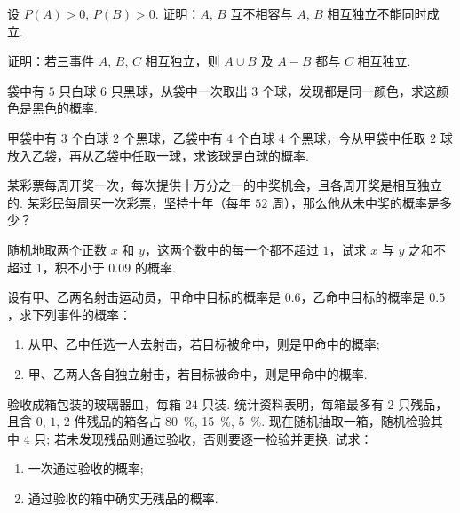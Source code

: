 	\begin{titwo}
		设 $P(A) > 0$, $P(B) > 0$. 证明：$A$, $B$ 互不相容与 $A$, $B$ 相互独立不能同时成立.
	\end{titwo}

	\begin{titwo}
		证明：若三事件 $A$, $B$, $C$ 相互独立，则 $A \cup B$ 及 $A - B$ 都与 $C$ 相互独立.
	\end{titwo}

	\begin{titwo}
		袋中有 $5$ 只白球 $6$ 只黑球，从袋中一次取出 $3$ 个球，发现都是同一颜色，求这颜色是黑色的概率.
	\end{titwo}

	\begin{titwo}
		甲袋中有 $3$ 个白球 $2$ 个黑球，乙袋中有 $4$ 个白球 $4$ 个黑球，今从甲袋中任取 $2$ 球放入乙袋，再从乙袋中任取一球，求该球是白球的概率.
	\end{titwo}

	\begin{titwo}
		某彩票每周开奖一次，每次提供十万分之一的中奖机会，且各周开奖是相互独立的. 某彩民每周买一次彩票，坚持十年（每年 $52$ 周），那么他从未中奖的概率是多少？
	\end{titwo}

	\begin{titwo}
		随机地取两个正数 $x$ 和 $y$，这两个数中的每一个都不超过 $1$，试求 $x$ 与 $y$ 之和不超过 $1$，积不小于 $0.09$ 的概率.
	\end{titwo}

	\begin{titwo}
		设有甲、乙两名射击运动员，甲命中目标的概率是 $0.6$，乙命中目标的概率是 $0.5$，求下列事件的概率：
		\begin{enumerate}
			\item 从甲、乙中任选一人去射击，若目标被命中，则是甲命中的概率;
			\item 甲、乙两人各自独立射击，若目标被命中，则是甲命中的概率.
		\end{enumerate}
	\end{titwo}

	\begin{titwo}
		验收成箱包装的玻璃器皿，每箱 $24$ 只装. 统计资料表明，每箱最多有 $2$ 只残品，且含 $0$, $1$, $2$ 件残品的箱各占 \SI{80}{\percent}, \SI{15}{\percent}, \SI{5}{\percent}. 现在随机抽取一箱，随机检验其中 $4$ 只; 若未发现残品则通过验收，否则要逐一检验并更换. 试求：
		\begin{enumerate}
			\item 一次通过验收的概率;
			\item 通过验收的箱中确实无残品的概率.
		\end{enumerate}
	\end{titwo}

